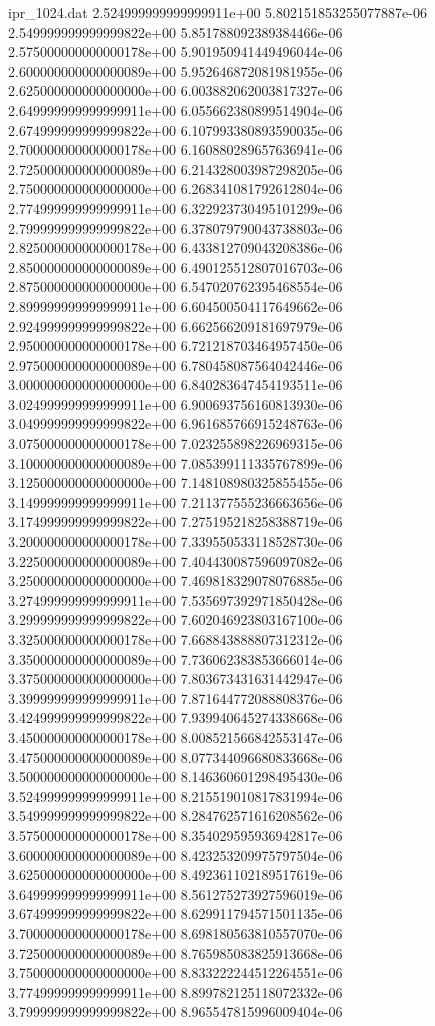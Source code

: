 \begin{filecontents}{ipr_1024.dat}
2.524999999999999911e+00 5.802151853255077887e-06
2.549999999999999822e+00 5.851788092389384466e-06
2.575000000000000178e+00 5.901950941449496044e-06
2.600000000000000089e+00 5.952646872081981955e-06
2.625000000000000000e+00 6.003882062003817327e-06
2.649999999999999911e+00 6.055662380899514904e-06
2.674999999999999822e+00 6.107993380893590035e-06
2.700000000000000178e+00 6.160880289657636941e-06
2.725000000000000089e+00 6.214328003987298205e-06
2.750000000000000000e+00 6.268341081792612804e-06
2.774999999999999911e+00 6.322923730495101299e-06
2.799999999999999822e+00 6.378079790043738803e-06
2.825000000000000178e+00 6.433812709043208386e-06
2.850000000000000089e+00 6.490125512807016703e-06
2.875000000000000000e+00 6.547020762395468554e-06
2.899999999999999911e+00 6.604500504117649662e-06
2.924999999999999822e+00 6.662566209181697979e-06
2.950000000000000178e+00 6.721218703464957450e-06
2.975000000000000089e+00 6.780458087564042446e-06
3.000000000000000000e+00 6.840283647454193511e-06
3.024999999999999911e+00 6.900693756160813930e-06
3.049999999999999822e+00 6.961685766915248763e-06
3.075000000000000178e+00 7.023255898226969315e-06
3.100000000000000089e+00 7.085399111335767899e-06
3.125000000000000000e+00 7.148108980325855455e-06
3.149999999999999911e+00 7.211377555236663656e-06
3.174999999999999822e+00 7.275195218258388719e-06
3.200000000000000178e+00 7.339550533118528730e-06
3.225000000000000089e+00 7.404430087596097082e-06
3.250000000000000000e+00 7.469818329078076885e-06
3.274999999999999911e+00 7.535697392971850428e-06
3.299999999999999822e+00 7.602046923803167100e-06
3.325000000000000178e+00 7.668843888807312312e-06
3.350000000000000089e+00 7.736062383853666014e-06
3.375000000000000000e+00 7.803673431631442947e-06
3.399999999999999911e+00 7.871644772088808376e-06
3.424999999999999822e+00 7.939940645274338668e-06
3.450000000000000178e+00 8.008521566842553147e-06
3.475000000000000089e+00 8.077344096680833668e-06
3.500000000000000000e+00 8.146360601298495430e-06
3.524999999999999911e+00 8.215519010817831994e-06
3.549999999999999822e+00 8.284762571616208562e-06
3.575000000000000178e+00 8.354029595936942817e-06
3.600000000000000089e+00 8.423253209975797504e-06
3.625000000000000000e+00 8.492361102189517619e-06
3.649999999999999911e+00 8.561275273927596019e-06
3.674999999999999822e+00 8.629911794571501135e-06
3.700000000000000178e+00 8.698180563810557070e-06
3.725000000000000089e+00 8.765985083825913668e-06
3.750000000000000000e+00 8.833222244512264551e-06
3.774999999999999911e+00 8.899782125118072332e-06
3.799999999999999822e+00 8.965547815996009404e-06

\end{filecontents}
